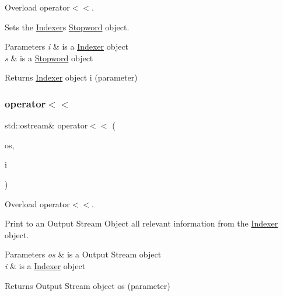 Overload operator$<$$<$. 

Sets the \hyperlink{class_indexer}{Indexer}\textquotesingle{}s \hyperlink{class_stopword}{Stopword} object.


\begin{DoxyParams}{Parameters}
{\em i} & is a \hyperlink{class_indexer}{Indexer} object \\
\hline
{\em s} & is a \hyperlink{class_stopword}{Stopword} object \\
\hline
\end{DoxyParams}
\begin{DoxyReturn}{Returns}
\hyperlink{class_indexer}{Indexer} object i (parameter) 
\end{DoxyReturn}
\mbox{\label{class_document_indexer_a09373f25959741150437b95f15ae11e2}} 
\subsubsection{\texorpdfstring{operator$<$$<$}{operator<<}\hspace{0.1cm}{\footnotesize\ttfamily [4/4]}}
{\footnotesize\ttfamily std\+::ostream\& operator$<$$<$ (\begin{DoxyParamCaption}\item[{std\+::ostream \&}]{os,  }\item[{const \hyperlink{class_document_indexer}{Document\+Indexer} \&}]{i }\end{DoxyParamCaption})\hspace{0.3cm}{\ttfamily [friend]}}



Overload operator$<$$<$. 

Print to an Output Stream Object all relevant information from the \hyperlink{class_indexer}{Indexer} object.


\begin{DoxyParams}{Parameters}
{\em os} & is a Output Stream object \\
\hline
{\em i} & is a \hyperlink{class_indexer}{Indexer} object \\
\hline
\end{DoxyParams}
\begin{DoxyReturn}{Returns}
Output Stream object os (parameter) 
\end{DoxyReturn}
\mbox{\label{class_document_indexer_adf57f424618ad5604e84eac633f977e9}} 
